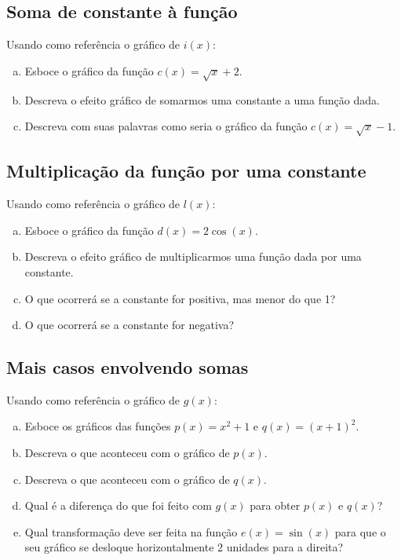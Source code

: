\documentclass[main_estudante.tex]{subfiles}
\begin{document}
\subsection*{Soma de constante à função}

\begin{questao}
Usando como referência o gráfico de $i(x)$:
\begin{enumerate}[a)]
\item Esboce o gráfico da função $c(x)=\sqrt{x}+2$.
\item Descreva o efeito gráfico de somarmos uma constante a uma função dada.
\item Descreva com suas palavras como seria o gráfico da função $c(x)=\sqrt{x}-1$.
\end{enumerate}
\end{questao}

\subsection*{Multiplicação da função por uma constante}

\begin{questao}
Usando como referência o gráfico de $l(x)$:
\begin{enumerate}[a)]
\item Esboce o gráfico da função $d(x)=2\cos(x)$.
\item Descreva o efeito gráfico de multiplicarmos uma função dada por uma constante.
\item O que ocorrerá se a constante for positiva, mas menor do que 1?
\item O que ocorrerá se a constante for negativa?
\end{enumerate}
\end{questao}

\subsection*{Mais casos envolvendo somas}

\begin{questao}
Usando como referência o gráfico de $g(x)$:
\begin{enumerate}[a)]
\item Esboce os gráficos das funções $p(x)=x^2+1$ e $q(x)=(x+1)^2$.
\item Descreva o que aconteceu com o gráfico de $p(x)$.
\item Descreva o que aconteceu com o gráfico de $q(x)$.
\item Qual é a diferença do que foi feito com $g(x)$ para obter $p(x)$ e $q(x)$?
\item Qual transformação deve ser feita na função $e(x)=\sin(x)$ para que o seu gráfico se desloque horizontalmente 2 unidades para a direita?
\end{enumerate}
\end{questao}
\end{document}
